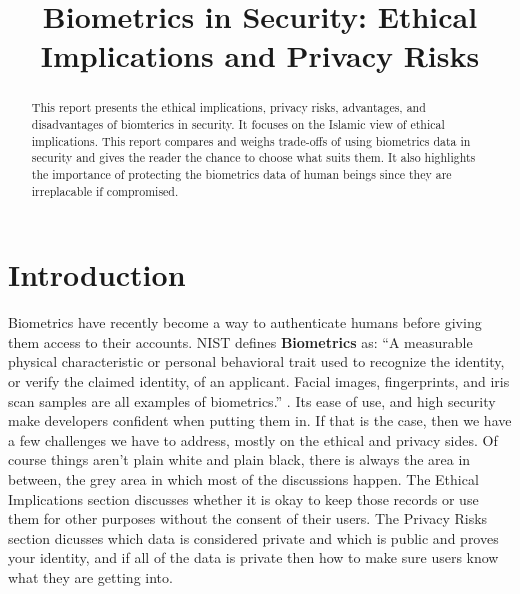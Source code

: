 \documentclass[conference]{IEEEtran}
\begin{document}
\title{Biometrics in Security: Ethical Implications and Privacy Risks}
\author{
    \vspace{0.05in}
}
\maketitle

\begin{abstract}
    This report presents the ethical implications, privacy risks, advantages, and disadvantages of biomterics in security. It focuses on the Islamic view of ethical implications. This report compares and weighs trade-offs of using biometrics data in security and gives the reader the chance to choose what suits them. It also highlights the importance of protecting the biometrics data of human beings since they are irreplacable if compromised.
\end{abstract}

\section{Introduction}

Biometrics have recently become a way to authenticate humans before giving them access to their accounts. NIST defines \textbf{Biometrics} as: ``A measurable physical characteristic or personal behavioral trait used to recognize the identity, or verify the claimed identity, of an applicant. Facial images, fingerprints, and iris scan samples are all examples of biometrics.'' \cite{nist_glossary_biometrics}. Its ease of use, and high security make developers confident when putting them in. If that is the case, then we have a few challenges we have to address, mostly on the ethical and privacy sides. Of course things aren't plain white and plain black, there is always the area in between, the grey area in which most of the discussions happen. The Ethical Implications section discusses whether it is okay to keep those records or use them for other purposes without the consent of their users. The Privacy Risks section dicusses which data is considered private and which is public and proves your identity, and if all of the data is private then how to make sure users know what they are getting into.
\end{document}
